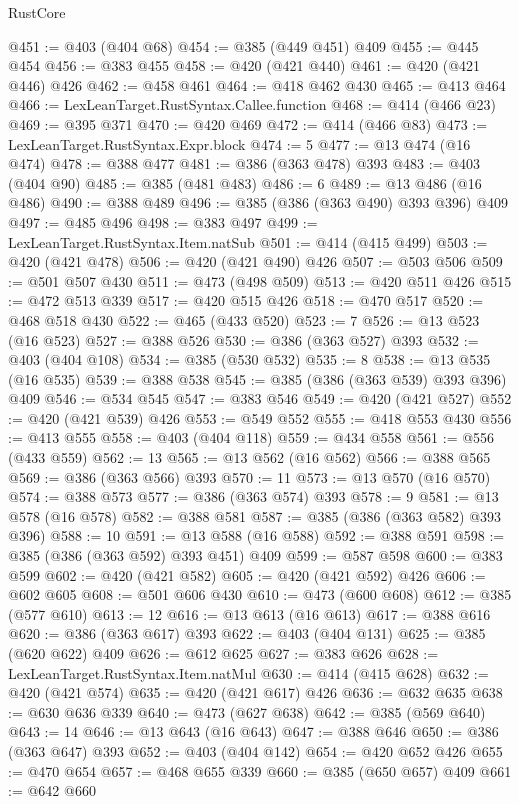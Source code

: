 \begin{lexlean}{RustCore}
\begin{coremodule}
@451 := @403 (@404 @68)
@454 := @385 (@449 @451) @409
@455 := @445 @454
@456 := @383 @455
@458 := @420 (@421 @440)
@461 := @420 (@421 @446) @426
@462 := @458 @461
@464 := @418 @462 @430
@465 := @413 @464
@466 := LexLeanTarget.RustSyntax.Callee.function
@468 := @414 (@466 @23)
@469 := @395 @371
@470 := @420 @469
@472 := @414 (@466 @83)
@473 := LexLeanTarget.RustSyntax.Expr.block
@474 := 5
@477 := @13 @474 (@16 @474)
@478 := @388 @477
@481 := @386 (@363 @478) @393
@483 := @403 (@404 @90)
@485 := @385 (@481 @483)
@486 := 6
@489 := @13 @486 (@16 @486)
@490 := @388 @489
@496 := @385 (@386 (@363 @490) @393 @396) @409
@497 := @485 @496
@498 := @383 @497
@499 := LexLeanTarget.RustSyntax.Item.natSub
@501 := @414 (@415 @499)
@503 := @420 (@421 @478)
@506 := @420 (@421 @490) @426
@507 := @503 @506
@509 := @501 @507 @430
@511 := @473 (@498 @509)
@513 := @420 @511 @426
@515 := @472 @513 @339
@517 := @420 @515 @426
@518 := @470 @517
@520 := @468 @518 @430
@522 := @465 (@433 @520)
@523 := 7
@526 := @13 @523 (@16 @523)
@527 := @388 @526
@530 := @386 (@363 @527) @393
@532 := @403 (@404 @108)
@534 := @385 (@530 @532)
@535 := 8
@538 := @13 @535 (@16 @535)
@539 := @388 @538
@545 := @385 (@386 (@363 @539) @393 @396) @409
@546 := @534 @545
@547 := @383 @546
@549 := @420 (@421 @527)
@552 := @420 (@421 @539) @426
@553 := @549 @552
@555 := @418 @553 @430
@556 := @413 @555
@558 := @403 (@404 @118)
@559 := @434 @558
@561 := @556 (@433 @559)
@562 := 13
@565 := @13 @562 (@16 @562)
@566 := @388 @565
@569 := @386 (@363 @566) @393
@570 := 11
@573 := @13 @570 (@16 @570)
@574 := @388 @573
@577 := @386 (@363 @574) @393
@578 := 9
@581 := @13 @578 (@16 @578)
@582 := @388 @581
@587 := @385 (@386 (@363 @582) @393 @396)
@588 := 10
@591 := @13 @588 (@16 @588)
@592 := @388 @591
@598 := @385 (@386 (@363 @592) @393 @451) @409
@599 := @587 @598
@600 := @383 @599
@602 := @420 (@421 @582)
@605 := @420 (@421 @592) @426
@606 := @602 @605
@608 := @501 @606 @430
@610 := @473 (@600 @608)
@612 := @385 (@577 @610)
@613 := 12
@616 := @13 @613 (@16 @613)
@617 := @388 @616
@620 := @386 (@363 @617) @393
@622 := @403 (@404 @131)
@625 := @385 (@620 @622) @409
@626 := @612 @625
@627 := @383 @626
@628 := LexLeanTarget.RustSyntax.Item.natMul
@630 := @414 (@415 @628)
@632 := @420 (@421 @574)
@635 := @420 (@421 @617) @426
@636 := @632 @635
@638 := @630 @636 @339
@640 := @473 (@627 @638)
@642 := @385 (@569 @640)
@643 := 14
@646 := @13 @643 (@16 @643)
@647 := @388 @646
@650 := @386 (@363 @647) @393
@652 := @403 (@404 @142)
@654 := @420 @652 @426
@655 := @470 @654
@657 := @468 @655 @339
@660 := @385 (@650 @657) @409
@661 := @642 @660

\end{coremodule}
\end{lexlean}
